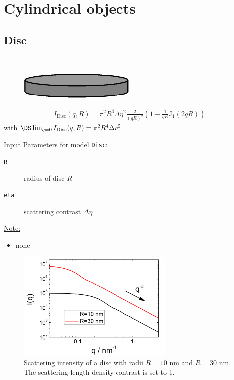 \clearpage
\section{Cylindrical objects}
\label{sect:CylindricalObjects}

\subsection{Disc}
\label{sect:Disc}
\hspace{1pt} \\

\begin{figure}[htb]
\begin{center}
\includegraphics[width=0.5\textwidth]{../images/form_factor/cylindrical_obj/disc.png}
\end{center}
\caption{} \label{disc}
\end{figure}
\begin{align}
I_\text{Disc}(q,R)=\pi^2R^4\Delta\eta^2\frac{2}{(qR)^2}
\left(1-\frac{1}{qR}\text{J}_1(2qR)\right)
\end{align}
with $\DS \lim_{q=0}I_\text{Disc}(q,R) = \pi^2R^4\Delta\eta^2$

\vspace{5mm}

\uline{Input Parameters for model \texttt{Disc}:}
\begin{description}
\item[\texttt{R}] radius of disc $R$
\item[\texttt{eta}] scattering contrast $\Delta\eta$
\end{description}

\noindent\uline{Note:}
\begin{itemize}
\item none
\end{itemize}

\begin{figure}[htb]
\begin{center}
\includegraphics[width=0.668\textwidth]{../images/form_factor/cylindrical_obj/DiscIQ.png}
\end{center}
\caption{Scattering intensity of a disc with radii $R=10$ nm and $R=30$ nm.
The scattering length density contrast is set to 1.}
\label{fig:I_disc}
\end{figure}

